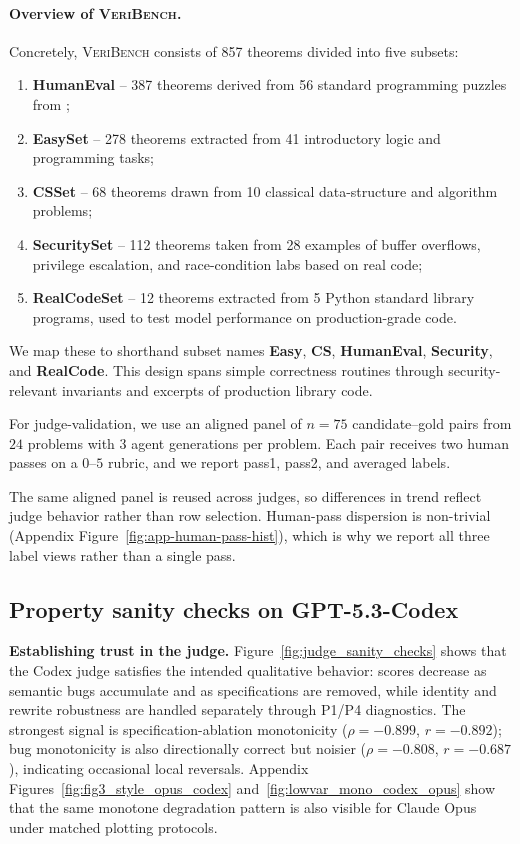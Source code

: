 \documentclass{article}
\begin{document}
\paragraph{Overview of \textsc{VeriBench}.}
Concretely, \textsc{VeriBench} consists of 857 theorems divided into five subsets:
\begin{enumerate}
  \item \textbf{HumanEval} -- 387 theorems derived from 56 standard programming puzzles from \citet{chen2021evaluating};
  \item \textbf{EasySet} -- 278 theorems extracted from 41 introductory logic and programming tasks;
  \item \textbf{CSSet} -- 68 theorems drawn from 10 classical data-structure and algorithm problems;
  \item \textbf{SecuritySet} -- 112 theorems taken from 28 examples of buffer overflows, privilege escalation, and race-condition labs based on real code;
  \item \textbf{RealCodeSet} -- 12 theorems extracted from 5 Python standard library programs, used to test model performance on production-grade code.
\end{enumerate}
We map these to shorthand subset names \textbf{Easy}, \textbf{CS}, \textbf{HumanEval}, \textbf{Security}, and \textbf{RealCode}. This design spans simple correctness routines through security-relevant invariants and excerpts of production library code.

For judge-validation, we use an aligned panel of \(n=75\) candidate--gold pairs from \(24\) problems with \(3\) agent generations per problem. Each pair receives two human passes on a \(0\)--\(5\) rubric, and we report pass1, pass2, and averaged labels.

The same aligned panel is reused across judges, so differences in trend reflect judge behavior rather than row selection. Human-pass dispersion is non-trivial (Appendix Figure~\ref{fig:app-human-pass-hist}), which is why we report all three label views rather than a single pass.

\subsection{Property sanity checks on GPT-5.3-Codex}
\textbf{Establishing trust in the judge.} Figure~\ref{fig:judge_sanity_checks} shows that the Codex judge satisfies the intended qualitative behavior: scores decrease as semantic bugs accumulate and as specifications are removed, while identity and rewrite robustness are handled separately through P1/P4 diagnostics. The strongest signal is specification-ablation monotonicity (\(\rho=-0.899\), \(r=-0.892\)); bug monotonicity is also directionally correct but noisier (\(\rho=-0.808\), \(r=-0.687\)), indicating occasional local reversals. Appendix Figures~\ref{fig:fig3_style_opus_codex} and~\ref{fig:lowvar_mono_codex_opus} show that the same monotone degradation pattern is also visible for Claude Opus under matched plotting protocols.
\end{document}
